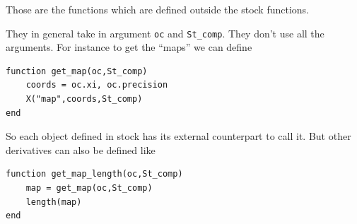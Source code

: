 \documentclass[11pt,a4paper,reqno,french,tikz]{amsart}
\begin{document}
Those are the functions which are defined outside the stock functions.

They in general take in argument \texttt{oc} and \texttt{St\_comp}. They don't use all the arguments. For instance to get the ``maps'' we can define
\begin{lstlisting} 
function get_map(oc,St_comp)
	coords = oc.xi, oc.precision
	X("map",coords,St_comp)
end
\end{lstlisting}
So each object defined in stock has its external counterpart to call it. But other derivatives can also be defined like
\begin{lstlisting} 
function get_map_length(oc,St_comp)
	map = get_map(oc,St_comp)
	length(map)
end
\end{lstlisting}




\end{document}
